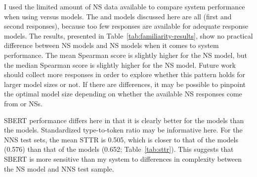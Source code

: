 I used the limited amount of  NS data available to compare system performance when using  versus  models. The  and  models discussed here are all  (first and second responses), because too few  responses are available for adequate  response models. The results, presented in Table~\ref{tab:familiarity-results}, show no practical difference between  NS models and  NS models when it comes to system performance. The mean Spearman score is slightly higher for the  NS model, but the median Spearman score is slightly higher for the  NS model. Future work should collect more  responses in order to explore whether this pattern holds for larger model sizes or not. If there are differences, it may be possible to pinpoint the optimal model size depending on whether the available NS responses come from  or  NSs.

SBERT performance differs here in that it is clearly better for the  models than the  models. Standardized type-to-token ratio may be informative here. For the NNS test sets, the mean STTR is 0.505, which is closer to that of the  models (0.576) than that of the  models (0.652; Table~\ref{tab:sttr}). This suggests that SBERT is more sensitive than my system to differences in complexity between the NS model and NNS test sample.



